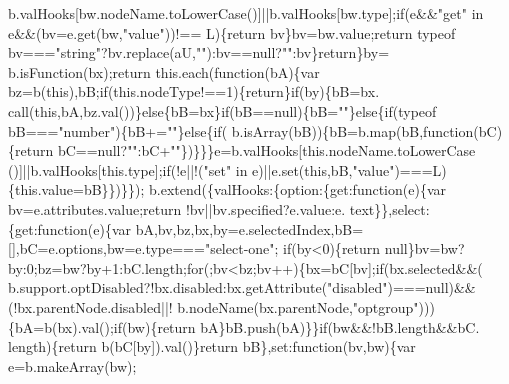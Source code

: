 \begin{DoxyCode}
      b.valHooks[bw.nodeName.toLowerCase()]||b.valHooks[bw.type];\textcolor{keywordflow}{if}(e&&\textcolor{stringliteral}{"get"} in e&&(bv=e.get(bw,\textcolor{stringliteral}{"value"}))!==
      L)\{\textcolor{keywordflow}{return} bv\}bv=bw.value;\textcolor{keywordflow}{return} typeof bv===\textcolor{stringliteral}{"string"}?bv.replace(aU,\textcolor{stringliteral}{""}):bv==null?\textcolor{stringliteral}{""}:bv\}\textcolor{keywordflow}{return}\}by=
      b.isFunction(bx);\textcolor{keywordflow}{return} this.each(\textcolor{keyword}{function}(bA)\{var bz=b(\textcolor{keyword}{this}),bB;\textcolor{keywordflow}{if}(this.nodeType!==1)\{\textcolor{keywordflow}{return}\}\textcolor{keywordflow}{if}(by)\{bB=bx.
      call(\textcolor{keyword}{this},bA,bz.val())\}\textcolor{keywordflow}{else}\{bB=bx\}\textcolor{keywordflow}{if}(bB==null)\{bB=\textcolor{stringliteral}{""}\}\textcolor{keywordflow}{else}\{\textcolor{keywordflow}{if}(typeof bB===\textcolor{stringliteral}{"number"})\{bB+=\textcolor{stringliteral}{""}\}\textcolor{keywordflow}{else}\{\textcolor{keywordflow}{if}(
      b.isArray(bB))\{bB=b.map(bB,\textcolor{keyword}{function}(bC)\{\textcolor{keywordflow}{return} bC==null?\textcolor{stringliteral}{""}:bC+\textcolor{stringliteral}{""}\})\}\}\}e=b.valHooks[\textcolor{keyword}{this}.nodeName.toLowerCase
      ()]||b.valHooks[this.type];\textcolor{keywordflow}{if}(!e||!(\textcolor{stringliteral}{"set"} in e)||e.set(\textcolor{keyword}{this},bB,\textcolor{stringliteral}{"value"})===L)\{this.value=bB\}\})\}\});
      b.extend(\{valHooks:\{option:\{\textcolor{keyword}{get}:\textcolor{keyword}{function}(e)\{var bv=e.attributes.value;\textcolor{keywordflow}{return} !bv||bv.specified?e.value:e.
      text\}\},select:\{\textcolor{keyword}{get}:\textcolor{keyword}{function}(e)\{var bA,bv,bz,bx,by=e.selectedIndex,bB=[],bC=e.options,bw=e.type===\textcolor{stringliteral}{"select-one"};\textcolor{keywordflow}{
      if}(by<0)\{\textcolor{keywordflow}{return} null\}bv=bw?by:0;bz=bw?by+1:bC.length;\textcolor{keywordflow}{for}(;bv<bz;bv++)\{bx=bC[bv];\textcolor{keywordflow}{if}(bx.selected&&(
      b.support.optDisabled?!bx.disabled:bx.getAttribute(\textcolor{stringliteral}{"disabled"})===null)&&(!bx.parentNode.disabled||!
      b.nodeName(bx.parentNode,\textcolor{stringliteral}{"optgroup"})))\{bA=b(bx).val();\textcolor{keywordflow}{if}(bw)\{\textcolor{keywordflow}{return} bA\}bB.push(bA)\}\}\textcolor{keywordflow}{if}(bw&&!bB.length&&bC.
      length)\{\textcolor{keywordflow}{return} b(bC[by]).val()\}\textcolor{keywordflow}{return} bB\},set:\textcolor{keyword}{function}(bv,bw)\{var e=b.makeArray(bw);

\end{DoxyCode}
